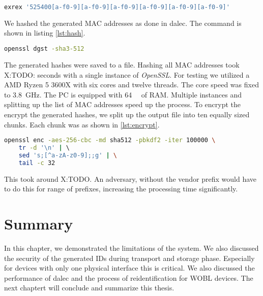     \begin{lstlisting}[language=bash, caption=MAC generation with exrex, label=lst:exrex]
    exrex '525400[a-f0-9][a-f0-9][a-f0-9][a-f0-9][a-f0-9][a-f0-9]'
    \end{lstlisting}    
    
    We hashed the generated MAC addresses as done in dalec. The command is shown in listing \ref{lst:hash}.
    
    \begin{lstlisting}[language=bash, caption=MAC hashing with OpenSSL, label=lst:hash]
        openssl dgst -sha3-512
    \end{lstlisting}
    
    The generated hashes were saved to a file. Hashing all MAC addresses took X:TODO: seconds with a single instance of \textit{OpenSSL}. 
    For testing we utilized a AMD Ryzen 5 3600X with six cores and twelve threads. The core speed was fixed to \SIlist{3.8}{\giga\hertz}. The PC is equipped with \SIlist{64}{\giga\byte} of RAM.
    Multiple instances and splitting up the list of MAC addresses speed up the process.
    To encrypt the encrypt the generated hashes, we split up the output file into ten equally sized chunks. Each chunk was as shown in \ref{lst:encrypt}.
    
    \begin{lstlisting}[language=bash, caption=ID encryption and truncation, label=lst:encryption]
    openssl enc -aes-256-cbc -md sha512 -pbkdf2 -iter 100000 \                              -k "$key" -S "$salt" -base64 | \                                      
    tr -d '\n' | \                                                        
    sed 's;[^a-zA-z0-9];;g' | \
    tail -c 32
    \end{lstlisting}
    
    This took around X:TODO. 
    An adversary, without the vendor prefix would have to do this for range of prefixes, increasing the processing time significantly.
    
    
    

\section{Summary}
In this chapter, we demonstrated the limitations of the system. We also discussed the security of the generated IDs during transport and storage phase. Especially for devices with only one physical interface this is critical. We also discussed the performance of dalec and the process of reidentification for WOBL devices.
The next chaptert will conclude and summarize this thesis.

